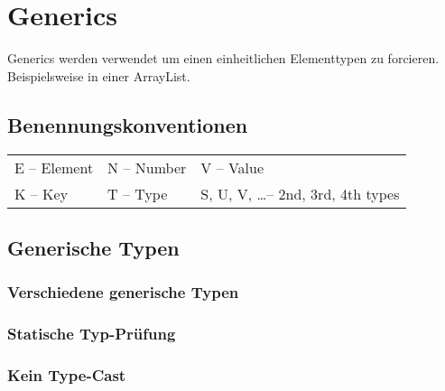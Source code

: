 \section{Generics}
Generics werden verwendet um einen einheitlichen Elementtypen zu forcieren. Beispielsweise in einer ArrayList.
\subsection{Benennungskonventionen}
\begin{tabularx}{\columnwidth}{@{}l l l@{}}
    \tabitem{}E -- Element & \tabitem{}N -- Number & \tabitem{}V -- Value\\

    \tabitem{}K -- Key &\tabitem{}T -- Type &\tabitem{}S, U, V, \ldots -- 2nd, 3rd, 4th types
\end{tabularx}

\subsection{Generische Typen}
\vspace{-0.8\abovedisplayskip}
\begin{minipage}[t]{0.6\columnwidth}
    \subsubsection{Verschiedene generische Typen}
    
\end{minipage}\hfill%
\begin{minipage}[t]{0.4\columnwidth}
    \subsubsection{Statische Typ-Prüfung}
    
\end{minipage}

\subsubsection{Kein Type-Cast}


